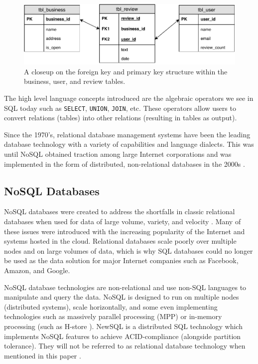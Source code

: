 \begin{figure}[h]
    \centering
    \includegraphics[width=13cm]{img/foreign-key.pdf}
    \caption{A closeup on the foreign key and primary key structure within the business, user, and review tables.}
    \label{fig:foreign-key}
\end{figure}

The high level language concepts introduced are the algebraic operators we see in SQL today such as \verb|SELECT|, \verb|UNION|, \verb|JOIN|, etc. These operators allow users to convert relations (tables) into other relations (resulting in tables as output).

Since the 1970's, relational database management systems have been the leading database technology with a variety of capabilities and language dialects. This was until NoSQL obtained traction among large Internet corporations and was implemented in the form of distributed, non-relational databases in the 2000s \cite{data-in-nosql}.

\subsection{NoSQL Databases}
\label{nosql-database}

NoSQL databases were created to address the shortfalls in classic relational databases when used for data of large volume, variety, and velocity \cite{nosql-db}. Many of these issues were introduced with the increasing popularity of the Internet and systems hosted in the cloud. Relational databases scale poorly over multiple nodes and on large volumes of data, which is why SQL databases could no longer be used as the data solution for major Internet companies such as Facebook, Amazon, and Google.

NoSQL database technologies are non-relational and use non-SQL languages to manipulate and query the data. NoSQL is designed to run on multiple nodes (distributed systems), scale horizontally, and some even implementing technologies such as massively parallel processing (MPP) \cite{tigergraph-mpp} or in-memory processing (such as H-store \cite{hstore}). NewSQL is a distributed SQL technology which implements NoSQL features to achieve ACID-compliance (alongside partition tolerance). They will not be referred to as relational database technology when mentioned in this paper \cite{nosql-db}.

